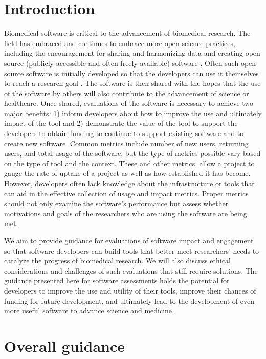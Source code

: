 \documentclass{article}
\begin{document}
\section{Introduction} Biomedical software is critical to the advancement of biomedical research. The field has embraced and continues to embrace more open science practices, including the encouragement for sharing and harmonizing data and creating open source (publicly accessible and often freely available) software \cite{green_strategic_2020, levet_developing_2021, itcr_open-source_2021}. Often such open source software is initially developed so that the developers can use it themselves to reach a research goal \cite{bitzer_intrinsic_2007}. The software is then shared with the hopes that the use of the software by others will also contribute to the advancement of science or healthcare. Once shared, evaluations of the software is necessary to achieve two major benefits: 1) inform developers about how to improve the use and ultimately impact of the tool and 2) demonstrate the value of the tool to support the developers to obtain funding to continue to support existing software and to create new software. Common metrics include number of new users, returning users, and total usage of the software, but the type of metrics possible vary based on the type of tool and the context. These and other metrics, allow a project to gauge the rate of uptake of a project as well as how established it has become. However, developers often lack knowledge about the infrastructure or tools that can aid in the effective collection of usage and impact metrics. Proper metrics should not only examine the software's performance but assess whether motivations and goals of the researchers who are using the software are being met.

We aim to provide guidance for evaluations of software impact and engagement so that software developers can build tools that better meet researchers' needs to catalyze the progress of biomedical research. We will also discuss ethical considerations and challenges of such evaluations that still require solutions. The guidance presented here for software assessments holds the potential for developers to improve the use and utility of their tools, improve their chances of funding for future development, and ultimately lead to the development of even more useful software to advance science and medicine \cite{wratten_reproducible_2021}. 


\section{Overall guidance}
\end{document}
